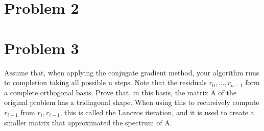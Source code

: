 \section{Problem 2}


\newpage
\section{Problem 3}
Assume that, when applying the conjugate gradient method, your algorithm runs to completion taking all possible n steps. Note that the residuals $r_0, ..., r_{n-1}$ form a complete orthogonal basis. Prove that, in this basis, the matrix A of the original problem has a tridiagonal shape. When using this to recursively compute $r_{i+1}$ from $r_i, r_{i-1}$, this is called the Lanczos iteration, and it is used to create a smaller matrix that approximated the spectrum of A.
\partbreak
